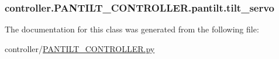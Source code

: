 \subsubsection[{tilt\+\_\+servo}]{\setlength{\rightskip}{0pt plus 5cm}controller.\+P\+A\+N\+T\+I\+L\+T\+\_\+\+C\+O\+N\+T\+R\+O\+L\+L\+E\+R.\+pantilt.\+tilt\+\_\+servo}\label{classcontroller_1_1PANTILT__CONTROLLER_1_1pantilt_a4b09a9cbf7fac18361ae3e9a772c7585}


The documentation for this class was generated from the following file\+:\begin{DoxyCompactItemize}
\item 
controller/\hyperlink{PANTILT__CONTROLLER_8py}{P\+A\+N\+T\+I\+L\+T\+\_\+\+C\+O\+N\+T\+R\+O\+L\+L\+E\+R.\+py}\end{DoxyCompactItemize}
